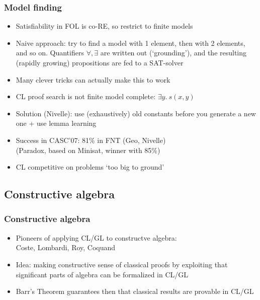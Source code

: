 \documentclass[handout,11pt]{beamer}
\newcommand{\red}[1]{\textcolor{red}{#1}}
\begin{document}
\begin{frame}
\frametitle{Model finding}
 \begin{itemize}[<+->]   %
    \item Satisfiability in FOL is co-RE, so restrict to finite models
    \item Naive approach: try to find a model with 1 element,
    then with 2 elements, and so on. Quantifiers $\forall,\exists$
    are written out (`grounding'), and the resulting (rapidly growing)
    propositions are fed to a SAT-solver
    \item Many clever tricks can actually make this to work
    \item CL proof search is not finite model complete: $\exists y.~s(x,y)$
    \item Solution (Nivelle): use (exhaustively) old constants 
    before you generate a new one + use lemma learning
    \item Success in CASC'07: 81\% in FNT (Geo, Nivelle)\\
             (Paradox, based on Minisat, winner with 85\%)
    \item CL competitive on problems `too big to ground'
 \end{itemize}
\end{frame}              

\subsection{Constructive algebra}

\begin{frame}
\frametitle{Constructive algebra}
 \begin{itemize}[<+->]   %
    \item Pioneers of applying CL/GL to constructve algebra:\\
  Coste, Lombardi, Roy, %
Coquand
    \item Idea: making constructive sense of classical proofs by
  exploiting that significant parts of algebra can be formalized in CL/GL
    \item Barr's Theorem guarantees then that classical results are provable in CL/GL
 \end{itemize}
\end{frame}
\end{document}
